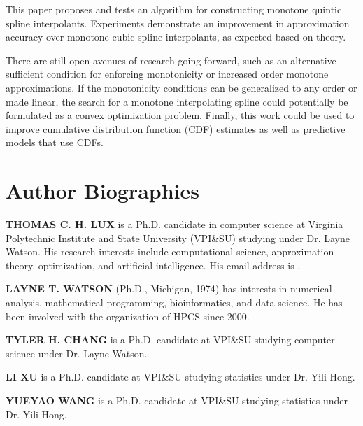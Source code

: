 \documentclass{scspaperproc}
\theoremstyle{scsthe}
\begin{document}
This paper proposes and tests an algorithm for constructing monotone quintic spline interpolants. Experiments demonstrate an improvement in approximation accuracy over monotone cubic spline interpolants, as expected based on theory.

There are still open avenues of research going forward, such as an alternative sufficient condition for enforcing monotonicity or increased order monotone approximations. If the monotonicity conditions can be generalized to any order or made linear, the search for a monotone interpolating spline could potentially be formulated as a convex optimization problem. Finally, this work could be used to improve cumulative distribution function (CDF) estimates as well as predictive models that use CDFs.







\section*{Author Biographies}

\textbf{\uppercase{THOMAS C. H. LUX}} is a Ph.D. candidate in computer
science at Virginia Polytechnic Institute and State University
(VPI\&SU) studying under Dr. Layne Watson. His research interests
include computational science, approximation theory, optimization, and
artificial intelligence. His email address is .

\textbf{\uppercase{Layne T. Watson}} (Ph.D., Michigan, 1974) has
interests in numerical analysis, mathematical programming,
bioinformatics, and data science.  He has been involved with the
organization of HPCS since 2000.

\textbf{\uppercase{Tyler H. Chang}} is a Ph.D. candidate at VPI\&SU
studying computer science under Dr. Layne Watson.

\textbf{\uppercase{Li Xu}} is a Ph.D. candidate at VPI\&SU studying
statistics under Dr. Yili Hong.

\textbf{\uppercase{Yueyao Wang}} is a Ph.D. candidate at VPI\&SU
studying statistics under Dr. Yili Hong.
\end{document}
